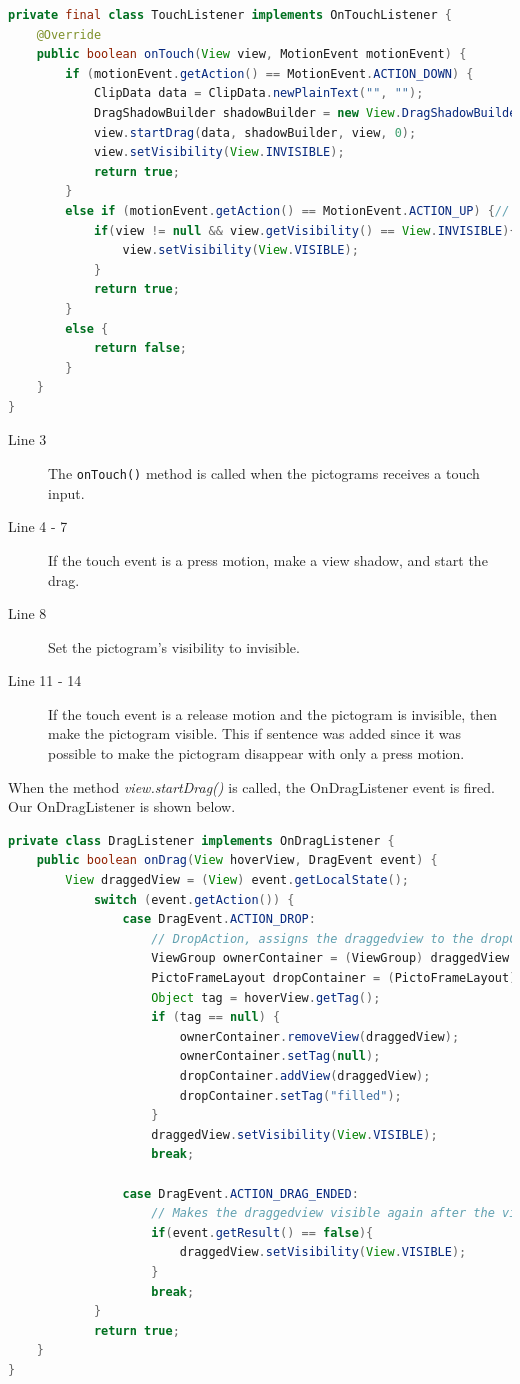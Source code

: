 \begin{lstlisting}[language=java,firstnumber=1,caption={Our TouchListener},label=lst:ourtouchlistener] 
private final class TouchListener implements OnTouchListener {
	@Override
	public boolean onTouch(View view, MotionEvent motionEvent) {
		if (motionEvent.getAction() == MotionEvent.ACTION_DOWN) {
			ClipData data = ClipData.newPlainText("", "");
			DragShadowBuilder shadowBuilder = new View.DragShadowBuilder(view);
			view.startDrag(data, shadowBuilder, view, 0);
			view.setVisibility(View.INVISIBLE);
			return true;
		}
		else if (motionEvent.getAction() == MotionEvent.ACTION_UP) {// prevents that a pictogram disappears if only pressed and no drag
			if(view != null && view.getVisibility() == View.INVISIBLE){
				view.setVisibility(View.VISIBLE);
			}
			return true;
		}
		else {
			return false;
		}
	}
}
\end{lstlisting}
\begin{description}
\item[Line 3] The \lstinline|onTouch()| method is called when the pictograms receives a touch input.
\item[Line 4 - 7] If the touch event is a press motion, make a view shadow, and start the drag.
\item[Line 8] Set the pictogram's visibility to invisible.
\item[Line 11 - 14] If the touch event is a release motion and the pictogram is invisible, then make the pictogram visible. This if sentence was added since it was possible to make the pictogram disappear with only a press motion.
\end{description}
When the method \textit{view.startDrag()} is called, the OnDragListener event is fired. Our OnDragListener is shown below.
\begin{lstlisting}[language=java,firstnumber=1,caption={Our DragListener},label=lst:ourdraglistener] 
private class DragListener implements OnDragListener {
	public boolean onDrag(View hoverView, DragEvent event) {
	    View draggedView = (View) event.getLocalState();
			switch (event.getAction()) {
				case DragEvent.ACTION_DROP:
					// DropAction, assigns the draggedview to the dropContainer if, the dropContainer does not already contain a pictogram.
					ViewGroup ownerContainer = (ViewGroup) draggedView.getParent();
					PictoFrameLayout dropContainer = (PictoFrameLayout) hoverView;
					Object tag = hoverView.getTag();
					if (tag == null) {
						ownerContainer.removeView(draggedView);
						ownerContainer.setTag(null);
						dropContainer.addView(draggedView);
						dropContainer.setTag("filled");
					}
					draggedView.setVisibility(View.VISIBLE);
					break;

				case DragEvent.ACTION_DRAG_ENDED:
					// Makes the draggedview visible again after the view has been moved or if drop wasn't valid.
					if(event.getResult() == false){
						draggedView.setVisibility(View.VISIBLE);
					}
					break;
			}
			return true;
	}
}
\end{lstlisting}
